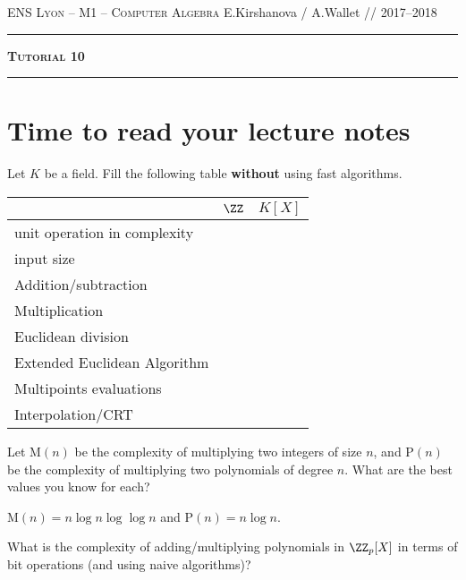 \documentclass[11pt]{exam}
\theoremstyle{definition}
\begin{document}
{\noindent
   \textsc{ENS Lyon --  M1 -- Computer Algebra}
   \hfill {E.Kirshanova / A.Wallet // 2017--2018\\
  }
  \hrule
  \begin{center}
    {\Large\textbf{
   \textsc{Tutorial 10}
    } } 
  \end{center}
  \hrule \vspace{5mm}

  \thispagestyle{empty}

  \section{Time to read your lecture notes}

  \begin{questions}
    \question Let $K$ be a field. Fill the following table \textbf{without} using fast algorithms.

    \begin{tabular}{l|c|c}
      & \hspace{2cm}$\ZZ$\hspace{2cm} & \hspace{2cm}$K[X]$\hspace{2cm} \\[2pt]\hline
      unit operation in complexity &  & \\[2pt]\hline
      input size & & \\[2pt]\hline
      Addition/subtraction & & \\[2pt]\hline
      Multiplication & & \\[2pt]\hline
      Euclidean division & & \\[2pt]\hline
      Extended Euclidean Algorithm & & \\[2pt]\hline
      Multipoints evaluations & & \\[2pt]\hline
      Interpolation/CRT & &
    \end{tabular}

    \question Let {\sc M}$(n)$ be the complexity of multiplying two integers of size $n$, and {\sc P}$(n)$ be the complexity of multiplying two polynomials of degree $n$. What are the best values you know for each?
    \begin{solution}
       {\sc M}$(n) = n\log n\log\log n$ and {\sc P}$(n)=n\log n$.
     \end{solution}

     \question What is the complexity of adding/multiplying polynomials in $\ZZ_p[X]$ in terms of bit operations (and using naive algorithms)?


\end{questions}}
\end{document}
